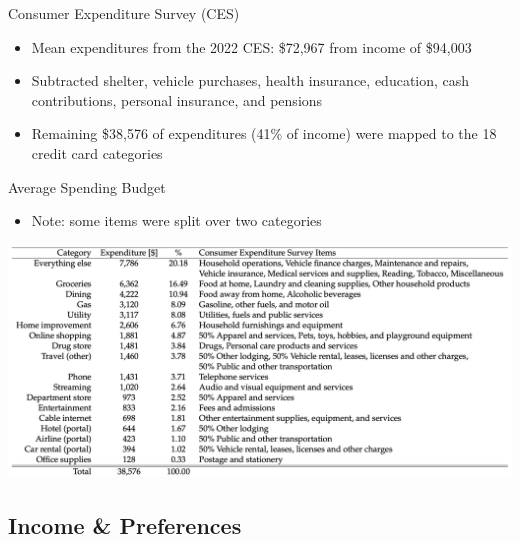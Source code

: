 \begin{frame}{Consumer Expenditure Survey (CES)}
    \begin{itemize}
        \item Mean expenditures from the 2022 CES: \$72,967 from income of \$94,003 \citep{bls:2023}
        \bigskip
        \item Subtracted shelter, vehicle purchases, health insurance, education, cash contributions, personal insurance, and pensions
        \bigskip
        \item Remaining \$38,576 of expenditures (41\% of income) were mapped to the 18 credit card categories
    \end{itemize}
\end{frame}

\begin{frame}{Average Spending Budget}
    \begin{itemize}
        \item Note: some items were split over two categories
    \end{itemize}
    \begin{center}
        \includegraphics[width=\textwidth]{../Misc/BudgetExtended.png}
    \end{center}
\end{frame}

\subsection{Income \& Preferences}

